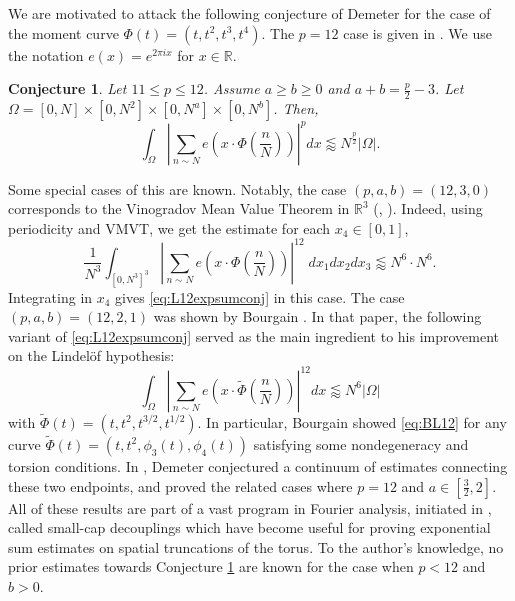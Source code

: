 \documentclass[12pt]{amsart}
\newtheorem{conj}[theorem]{Conjecture}
\providecommand{\R}{\mathbb R}
\begin{document}
We are motivated to attack the following conjecture of Demeter \cite[Conjecture 8.1]{demeter2021l12squarerootcancellation} for the case of the moment curve $\Phi(t)= (t, t^2, t^3, t^4)$. The $p=12$ case is given in \cite[Conjecture 1.1]{demeter2021l12squarerootcancellation}. We use the notation $e(x) = e^{2\pi i x}$ for $x\in \R$.
%
\begin{conj}\label{conj:L12}
    Let $11\le p\le 12$. Assume $a\ge b\ge 0$ and $a+b=\frac{p}{2}-3$. Let $\Omega = [0,N]\times [0,N^2]\times [0,N^a]\times [0,N^b]$. Then, \begin{equation}\label{eq:L12expsumconj}
        \int_\Omega \left|\sum_{n\sim N}e(x\cdot \Phi\left(\frac{n}{N}\right))\right|^{p} dx \lessapprox N^{\frac{p}{2}}|\Omega|.
    \end{equation}
\end{conj}
%
Some special cases of this are known. Notably, the case $(p, a,b)=(12, 3,0)$ corresponds to the Vinogradov Mean Value Theorem in $\R^3$ (\cite{Wooley_2016}, \cite{bourgain2016proofmainconjecturevinogradovs}). Indeed, using periodicity and VMVT, we get the estimate for each $x_4\in [0,1]$, $$\frac{1}{N^3}\int_{[0,N^3]^3}\left|\sum_{n\sim N}e(x\cdot \Phi\left(\frac{n}{N}\right)) \right|^{12}\; dx_1dx_2dx_3 \lessapprox N^{6}\cdot N^6.$$ Integrating in $x_4$ gives \eqref{eq:L12expsumconj} in this case. The case $(p, a,b)=(12, 2,1)$ was shown by Bourgain \cite{bourgain2016decouplingexponentialsumsriemann}. In that paper, the following variant of \eqref{eq:L12expsumconj} served as the main ingredient to his improvement on the Lindel\"{o}f hypothesis: \begin{equation}\label{eq:BL12}
    \int_{\Omega}\left|\sum_{n\sim N}e(x\cdot \tilde{\Phi}\left(\frac{n}{N}\right))\right|^{12} dx \lessapprox N^{6}|\Omega|
\end{equation} with $\tilde{\Phi}(t) = (t,t^2, t^{3/2}, t^{1/2})$. In particular, Bourgain showed \eqref{eq:BL12} for any curve $\tilde{\Phi}(t)=(t, t^2, \phi_3(t), \phi_4(t))$ satisfying some nondegeneracy and torsion conditions. In \cite{demeter2021l12squarerootcancellation}, Demeter conjectured a continuum of estimates connecting these two endpoints, and proved the related cases where $p=12$ and $a\in [\frac{3}{2}, 2]$. All of these results are part of a vast program in Fourier analysis, initiated in \cite{demeter2020smallcapdecouplings}, called small-cap decouplings which have become useful for proving exponential sum estimates on spatial truncations of the torus. To the author's knowledge, no prior estimates towards Conjecture \ref{conj:L12} are known for the case when $p<12$ and $b>0$.
\end{document}
